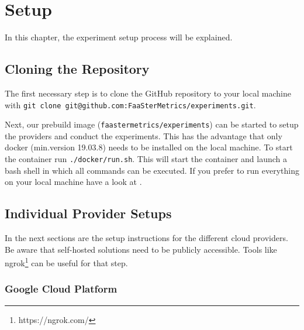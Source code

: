\documentclass[../main.tex]{subfiles}
\begin{document}
\section{Setup}\label{sec:setup}
In this chapter, the experiment setup process will be explained.


\subsection{Cloning the Repository}\label{sec:clonesetup}

The first necessary step is to clone the GitHub repository to your local machine with 
\texttt{git clone git@github.com:FaaSterMetrics/experiments.git}. 

Next, our prebuild image (\texttt{faastermetrics/experiments}) can be started to setup the providers and conduct the experiments. 
This has the advantage that only docker (min.\@ version 19.03.8) needs to be installed on the local machine. 
To start the container run \texttt{./docker/run.sh}. 
This will start the container and launch a bash shell in which all commands can be executed.
If you prefer to run everything on your local machine have a look at .

\subsection{Individual Provider Setups}\label{sec:providersetup}

In the next sections are the setup instructions for the different cloud providers. 
Be aware that self-hosted solutions need to be publicly accessible. 
Tools like ngrok\footnote{https://ngrok.com/} can be useful for that step.

\subsubsection{Google Cloud Platform}\label{sec:providersetupgcp}
\end{document}
